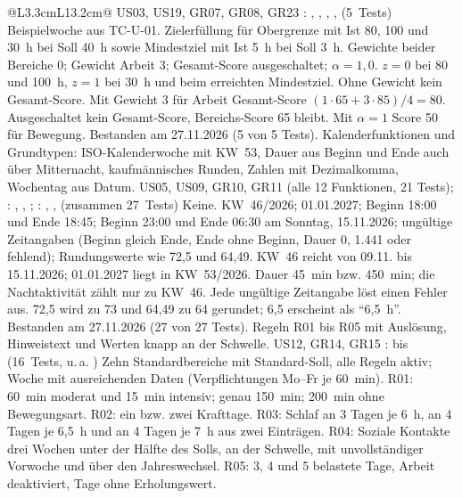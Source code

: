 \begin{longtable}{@{}L{3.3cm}L{13.2cm}@{}}
    {US03, US19, GR07, GR08, GR23}
    {: , , , ,  (5~Tests)}
    {Beispielwoche aus TC-U-01.}
    {Zielerfüllung für Obergrenze mit Ist 80, 100 und 30~h bei Soll 40~h sowie Mindestziel mit Ist 5~h bei Soll 3~h. Gewichte beider Bereiche 0; Gewicht Arbeit 3; Gesamt-Score ausgeschaltet; $\alpha = 1{,}0$.}
    {$z = 0$ bei 80 und 100~h, $z = 1$ bei 30~h und beim erreichten Mindestziel. Ohne Gewicht kein Gesamt-Score. Mit Gewicht 3 für Arbeit Gesamt-Score $(1 \cdot 65 + 3 \cdot 85)/4 = 80$. Ausgeschaltet kein Gesamt-Score, Bereichs-Score 65 bleibt. Mit $\alpha = 1$ Score 50 für Bewegung.}
    {Bestanden am 27.11.2026 (5 von 5 Tests).}
  \midrule
    {Kalenderfunktionen und Grundtypen: ISO-Kalenderwoche mit KW~53, Dauer aus Beginn und Ende auch über Mitternacht, kaufmännisches Runden, Zahlen mit Dezimalkomma, Wochentag aus Datum.}
    {US05, US09, GR10, GR11}
    { (alle 12 Funktionen, 21 Tests); : , , ; : , ,  (zusammen 27~Tests)}
    {Keine.}
    {KW~46/2026; 01.01.2027; Beginn 18:00 und Ende 18:45; Beginn 23:00 und Ende 06:30 am Sonntag, 15.11.2026; ungültige Zeitangaben (Beginn gleich Ende, Ende ohne Beginn, Dauer 0, 1.441 oder fehlend); Rundungswerte wie 72,5 und 64,49.}
    {KW~46 reicht von 09.11. bis 15.11.2026; 01.01.2027 liegt in KW~53/2026. Dauer 45~min bzw. 450~min; die Nachtaktivität zählt nur zu KW~46. Jede ungültige Zeitangabe löst einen Fehler aus. 72,5 wird zu 73 und 64,49 zu 64 gerundet; 6,5 erscheint als \enquote{6,5~h}.}
    {Bestanden am 27.11.2026 (27 von 27 Tests).}
  \midrule
    {Regeln R01 bis R05 mit Auslösung, Hinweistext und Werten knapp an der Schwelle.}
    {US12, GR14, GR15}
    {:  bis  (16~Tests, u.\,a. )}
    {Zehn Standardbereiche mit Standard-Soll, alle Regeln aktiv; Woche mit ausreichenden Daten (Verpflichtungen Mo--Fr je 60~min).}
    {R01: 60~min moderat und 15~min intensiv; genau 150~min; 200~min ohne Bewegungsart. R02: ein bzw. zwei Krafttage. R03: Schlaf an 3 Tagen je 6~h, an 4 Tagen je 6,5~h und an 4 Tagen je 7~h aus zwei Einträgen. R04: Soziale Kontakte drei Wochen unter der Hälfte des Solls, an der Schwelle, mit unvollständiger Vorwoche und über den Jahreswechsel. R05: 3, 4 und 5 belastete Tage, Arbeit deaktiviert, Tage ohne Erholungswert.}

\end{longtable}
